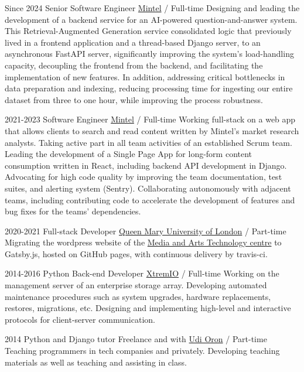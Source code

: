 \documentclass[]{friggeri-cv}
\begin{document}
\begin{entrylist}

  \entry
  {Since 2024}
  {Senior Software Engineer}
  {\href{https://www.mintel.com/}{Mintel} / Full-time}
  {
    Designing and leading the development of a backend service for an AI-powered question-and-answer system.
    This Retrieval-Augmented Generation service consolidated logic that previously lived in a frontend application and a thread-based Django server, to an asynchronous FastAPI server, significantly improving the system's load-handling capacity, decoupling the frontend from the backend, and facilitating the implementation of new features.
    In addition, addressing critical bottlenecks in data preparation and indexing, reducing processing time for ingesting our entire dataset from three to one hour, while improving the process robustness.
  }

  \entry
  {2021-2023}
  {Software Engineer}
  {\href{https://www.mintel.com/}{Mintel} / Full-time}
  {
    Working full-stack on a web app that allows clients to search and read content written by Mintel's market research analysts. Taking active part in all team activities of an established Scrum team.
    Leading the development of a Single Page App for long-form content consumption written in React, including backend API development in Django.
    Advocating for high code quality by improving the team documentation, test suites, and alerting system (Sentry).
    Collaborating autonomously with adjacent teams, including contributing code to accelerate the development of features and bug fixes for the teams' dependencies.
  }

  \entry
  {2020-2021}
  {Full-stack Developer}
  {\href{https://qmul.ac.uk/}{Queen Mary University of London} / Part-time}
  {
    Migrating the wordpress website of the \href{https://mat.qmul.ac.uk/}{Media and Arts Technology centre} to Gatsby.js, hosted on GitHub pages, with continuous delivery by travis-ci.
  }

  \entry
  {2014-2016}
  {Python Back-end Developer}
  {\href{http://xtremio.com/}{XtremIO} / Full-time}
  {
    Working on the management server of an enterprise storage array.
    Developing automated maintenance procedures such as system upgrades, hardware replacements, restores, migrations, etc.
    Designing and implementing high-level and interactive protocols for client-server communication.
  }

  \entry
  {2014}
  {Python and Django tutor}
  {Freelance and with \href{http://www.10x.org.il/}{Udi Oron} / Part-time}
  {
    Teaching programmers in tech companies and privately.
    Developing teaching materials as well as teaching and assisting in class.
  }


\end{entrylist}
\end{document}
